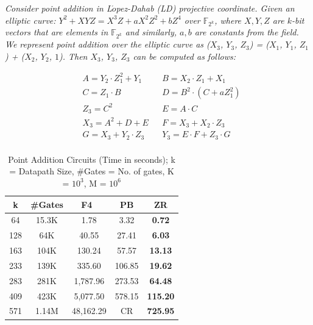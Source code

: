 \begin{Example}
{\it Consider point addition in L$\acute{o}$pez-Dahab (LD) projective coordinate. Given an elliptic curve: $Y^2 + XYZ = X^3Z + aX^2Z^2 + bZ^4$ over $\mathbb{F}_{2^k}$, where $X,Y,Z$ are $k$-bit vectors that are elements in $\mathbb{F}_{2^k}$ and similarly, $a, b$ are constants from the field. We represent point addition over the elliptic curve as ($X_3$, $Y_3$, $Z_3$) = ($X_1$, $Y_1$, $Z_1$) + ($X_2$, $Y_2$, $1$).  Then $X_3$, $Y_3$, $Z_3$ can be computed as follows:} 

\begin{align*}
&A = Y_2 \cdot Z_1^2 + Y_1  &&B = X_2 \cdot Z_1 + X_1 \\
&C = Z_1 \cdot B  &&D = B^2 \cdot(C + a Z_1^2) \\
&Z_3 = C^2 && E = A \cdot C  \\
&X_3 = A^2 + D + E &&F = X_3 + X_2 \cdot Z_3 \\
&G = X_3 + Y_2\cdot Z_3 && Y_3 = E\cdot F + Z_3 \cdot G \\
\end{align*}
\end{Example}

\begin{table}[H]
\centering
\caption{Point Addition Circuits (Time in seconds); k = Datapath Size, \#Gates = No. of gates, K = $10^3$, M = $10^6$}
\label{pointadd}
\begin{tabular}{| c | c | c | c | c |} \hline
\textbf{k}&\textbf{\#Gates}&\textbf{F4~\cite{pruss:tcad}}&\textbf{PB}&\textbf{ZR} \\ \hline
64&15.3K&1.78&3.32&\textbf{0.72} \\ \hline
128&64K&40.55&27.41&\textbf{6.03} \\ \hline
163&104K&130.24&57.57&\textbf{13.13} \\ \hline
233&139K&335.60&106.85&\textbf{19.62} \\ \hline
283&281K&1,787.96&273.53& \textbf{64.48}\\ \hline
409&423K&5,077.50&578.15& \textbf{115.20}\\ \hline
571&1.14M&48,162.29&CR&\textbf{725.95} \\ \hline
\end{tabular}
\end{table}

